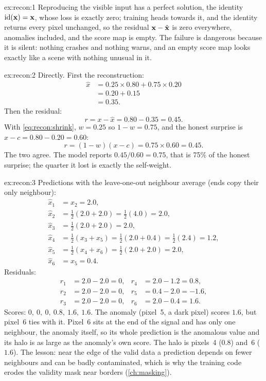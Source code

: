 
\begin{solution}{ex:recon:1}
Reproducing the visible input has a perfect solution, the identity $\mathrm{id}(\mathbf{x})=\mathbf{x}$,
whose loss is exactly zero; training heads towards it, and the identity returns every pixel unchanged,
so the residual $\mathbf{x}-\hat{\mathbf{x}}$ is zero everywhere, anomalies included, and the score map is empty.
The failure is dangerous because it is silent: nothing crashes and nothing warns, and an empty score map
looks exactly like a scene with nothing unusual in it.
\end{solution}

\begin{solution}{ex:recon:2}
Directly. First the reconstruction:
\begin{align*}
\hat{x} &= 0.25 \times 0.80 + 0.75 \times 0.20\\
&= 0.20 + 0.15\\
&= 0.35.
\end{align*}
Then the residual:
\[
r = x - \hat{x} = 0.80 - 0.35 = 0.45.
\]
With \cref{eq:recon:shrink}, $w = 0.25$ so $1-w = 0.75$, and the honest surprise is
$x - c = 0.80 - 0.20 = 0.60$:
\[
r = (1-w)(x-c) = 0.75 \times 0.60 = 0.45.
\]
The two agree. The model reports $0.45/0.60 = 0.75$, that is 75\% of the honest surprise; the
quarter it lost is exactly the self-weight.
\end{solution}

\begin{solution}{ex:recon:3}
Predictions with the leave-one-out neighbour average (ends copy their only neighbour):
\begin{align*}
\hat{x}_1 &= x_2 = 2.0,\\
\hat{x}_2 &= \tfrac12(2.0 + 2.0) = \tfrac12(4.0) = 2.0,\\
\hat{x}_3 &= \tfrac12(2.0 + 2.0) = 2.0,\\
\hat{x}_4 &= \tfrac12(x_3 + x_5) = \tfrac12(2.0 + 0.4) = \tfrac12(2.4) = 1.2,\\
\hat{x}_5 &= \tfrac12(x_4 + x_6) = \tfrac12(2.0 + 2.0) = 2.0,\\
\hat{x}_6 &= x_5 = 0.4.
\end{align*}
Residuals:
\begin{align*}
r_1 &= 2.0-2.0 = 0, & r_4 &= 2.0 - 1.2 = 0.8,\\
r_2 &= 2.0-2.0 = 0, & r_5 &= 0.4 - 2.0 = -1.6,\\
r_3 &= 2.0-2.0 = 0, & r_6 &= 2.0 - 0.4 = 1.6.
\end{align*}
Scores: $0,\ 0,\ 0,\ 0.8,\ 1.6,\ 1.6$. The anomaly (pixel~5, a dark pixel) scores $1.6$, but pixel~6
ties with it. Pixel~6 sits at the end of the signal and has only one neighbour, the anomaly itself, so
its whole prediction is the anomalous value and its halo is as large as the anomaly's own score.
The halo is pixels~4 ($0.8$) and~6 ($1.6$). The lesson: near the edge of the valid data a prediction
depends on fewer neighbours and can be badly contaminated, which is why the training code erodes the
validity mask near borders (\cref{ch:masking}).
\end{solution}


